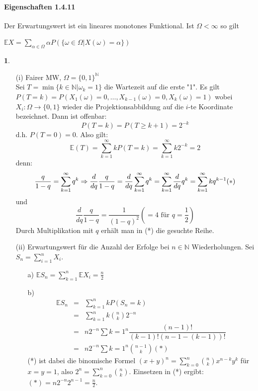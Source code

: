 \documentclass[10pt,a4paper]{report}
\numberwithin{equation}{section}
\numberwithin{figure}{section}
\theoremstyle{plain}
\theoremstyle{definition}
\newtheorem{example}[thm]{\protect\examplename}
\theoremstyle{remark}
\theoremstyle{plain}
\providecommand{\examplename}{Beispiel}
\newcommand{\1}{ \mathbb{1} } %
\begin{document}
\paragraph{Eigenschaften 1.4.11}
Der Erwartungswert ist ein lineares monotones Funktional. Ist $\Omega<\infty$ so gilt
\begin{center}
  $\mathbb{E}X=\sum\limits_{\alpha \in \Omega}\alpha P(\{\omega \in \Omega|X(\omega)=\alpha\})$
\end{center}
\begin{example} \ 
  \begin{itemize}
  \item[(i)] Fairer MW, $\Omega=\{0,1\}^{\mathbb{N}}$\\
    Sei $T=\min\{k\in \mathbb{N}|\omega_k=1\}$ die Wartezeit auf die erste "1".
    Es gilt $P(T=k)=P(X_1(\omega)=0,\dots,X_{k-1}(\omega)=0,X_k(\omega)=1)$ wobei $X_i:\Omega \to \{0,1\}$ wieder die Projektionsabbildung auf die $i$-te Koordinate bezeichnet. Dann ist offenbar:
    \[P(T=k)=P(T\geq k+1)=2^{-k}\] 
    d.h. $P(T=0)=0$. Also gilt:
    \[\mathbb{E}(T)=\sum\limits_{k=1}^\infty kP(T=k)=\sum\limits_{k=1}^\infty k2^{-k}=2\]
    denn: \[\dfrac{q}{1-q}=\sum\limits_{k=1}^\infty q^k \Rightarrow \dfrac{d}{dq}\dfrac{q}{1-q}=\dfrac{d}{dq}\sum\limits_{k=1}^\infty q^k=\sum\limits_{k=1}^\infty \dfrac{d}{dq} q^k=\sum\limits_{k=1}^\infty kq^{k-1} \hfill (*)\]
    und \[\dfrac{d}{dq}\dfrac{q}{1-q}=\dfrac{1}{(1-q)^2} (=4 \text{ für } q=\dfrac{1}{2})\]
    Durch Multiplikation mit $q$ erhält man in (*) die gesuchte Reihe.
  \item[(ii)] Erwartungswert für die Anzahl der Erfolge bei $n \in \mathbb{N}$ Wiederholungen. Sei $S_n=\sum\limits_{i=1}^nX_i$.
    \begin{itemize}
    \item[a)]
      $\mathbb{E}S_n=\sum\limits_{k=1}^n\mathbb{E}X_i=\frac{n}{2}$
    \item[b)]\begin{eqnarray*}
        \mathbb{E}S_n&=&\sum\limits_{k=1}^nkP(S_n=k)\\
        &=& \sum\limits_{k=1}^nk\binom{n}{k}2^{-n}\\
        &=& n 2^{-n} \sum\limits{k=1}^n\dfrac{(n-1)!}{(k-1)!(n-1-(k-1))!}\\
        &=& n 2^{-n} \sum\limits{k=1}^n \binom{n-1}{k}  (*)
      \end{eqnarray*}
      (*) ist dabei die binomische Formel $(x+y)^n=\sum\limits_{k=0}^n\binom{n}{k}x^{n-k}y^k$ für $x=y=1$, also $2^n=\sum\limits_{k=0}^n\binom{n}{k}$. Einsetzen in (*) ergibt: $(*)=n2^{-n}2^{n-1}=\frac{n}{2}$.
    \end{itemize}
  \end{itemize}

\end{example}
\end{document}
